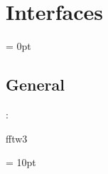 
\section{Interfaces} 


\parskip = 0pt

\vspace{3mm} \subsection*{General}

: 

fftw3
\vspace{2mm}

\vspace{5mm}\parskip = 10pt 
